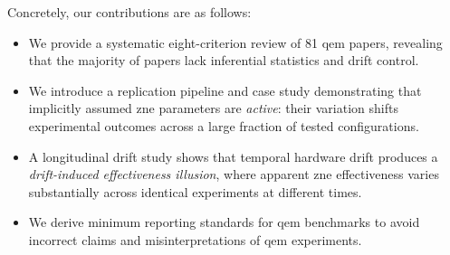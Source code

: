 \documentclass[10pt,conference]{IEEEtran}
\begin{document}
Concretely, our contributions are as follows:
\begin{itemize}
  \item We provide a systematic eight-criterion review of 81 \gls{qem} papers, revealing that the majority of papers lack inferential statistics and drift control.
  \item We introduce a replication pipeline and case study demonstrating that implicitly assumed \gls{zne} parameters are \emph{active}: their variation shifts experimental outcomes across a large fraction of tested configurations.
  \item A longitudinal drift study shows that temporal hardware drift produces a \emph{drift-induced effectiveness illusion}, where apparent \gls{zne} effectiveness varies substantially across identical experiments at different times.
  \item We derive minimum reporting standards for \gls{qem} benchmarks to avoid incorrect claims and misinterpretations of \gls{qem} experiments.
\end{itemize}
\end{document}
